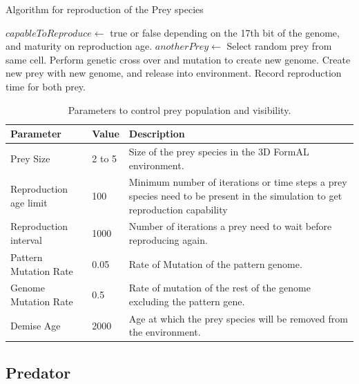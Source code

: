 \documentclass[letterpaper]{article}
\numberwithin{equation}{section}
\begin{document}
\begin{algorithm}[h]
	\caption{Algorithm for reproduction of the Prey species}
	\label{algo:algorithm-reproduction-prey}
	\begin{algorithmic}
			\STATE $capableToReproduce \gets$ true or false depending on the 17th bit of the genome, and maturity on reproduction age.
				\STATE $anotherPrey \gets$ Select random prey from same cell.
					\STATE Perform genetic cross over and mutation to create new genome.
					\STATE Create new prey with new genome, and release into environment.
					\STATE Record reproduction time for both prey.
				\ENDIF
			\ENDIF
		\ENDFOR
	\end{algorithmic}
\end{algorithm}

\begin{table}[h]
\centering
\setlength\tabcolsep{2pt}
\begin{tabular}{| p{2cm} | p{1cm} | p{5cm} |}
	\hline
		\textbf{Parameter} & \textbf{Value} & \textbf{Description} \\ \hline
		Prey Size & 2 to 5 & Size of the prey species in the 3D FormAL  environment.\\ \hline
		Reproduction age limit & 100 & Minimum number of iterations or time steps a prey species need to be present in the simulation to get reproduction capability\\ \hline
		Reproduction interval & 1000 & Number of iterations a prey need to wait before reproducing again.\\ \hline
		Pattern Mutation Rate & 0.05 & Rate of Mutation of the pattern genome.\\ \hline
		Genome Mutation Rate & 0.5 & Rate of mutation of the rest of the genome excluding the pattern gene.\\ \hline
		Demise Age & 2000 & Age at which the prey species will be removed from the environment.\\
	\hline
\end{tabular}
\caption{Parameters to control prey population and visibility.}
\label{tab:prey-control-parameters}
\end{table}

\subsection{Predator}
\end{document}
